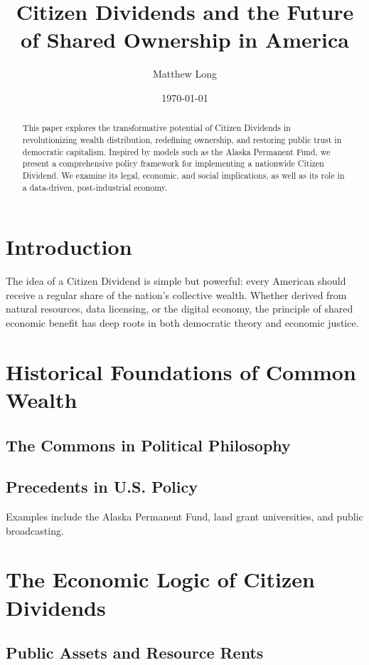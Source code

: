 \documentclass[11pt]{article}
\title{Citizen Dividends and the Future of Shared Ownership in America}
\author{Matthew Long}
\date{\today}
\begin{document}
\maketitle

\begin{abstract}
This paper explores the transformative potential of Citizen Dividends in revolutionizing wealth distribution, redefining ownership, and restoring public trust in democratic capitalism. Inspired by models such as the Alaska Permanent Fund, we present a comprehensive policy framework for implementing a nationwide Citizen Dividend. We examine its legal, economic, and social implications, as well as its role in a data-driven, post-industrial economy.
\end{abstract}

\section{Introduction}
The idea of a Citizen Dividend is simple but powerful: every American should receive a regular share of the nation\textquoteright s collective wealth. Whether derived from natural resources, data licensing, or the digital economy, the principle of shared economic benefit has deep roots in both democratic theory and economic justice.

\section{Historical Foundations of Common Wealth}
\subsection{The Commons in Political Philosophy}
\lipsum[1-2]

\subsection{Precedents in U.S. Policy}
Examples include the Alaska Permanent Fund, land grant universities, and public broadcasting.

\section{The Economic Logic of Citizen Dividends}
\subsection{Public Assets and Resource Rents}
\lipsum[3-4]
\end{document}
